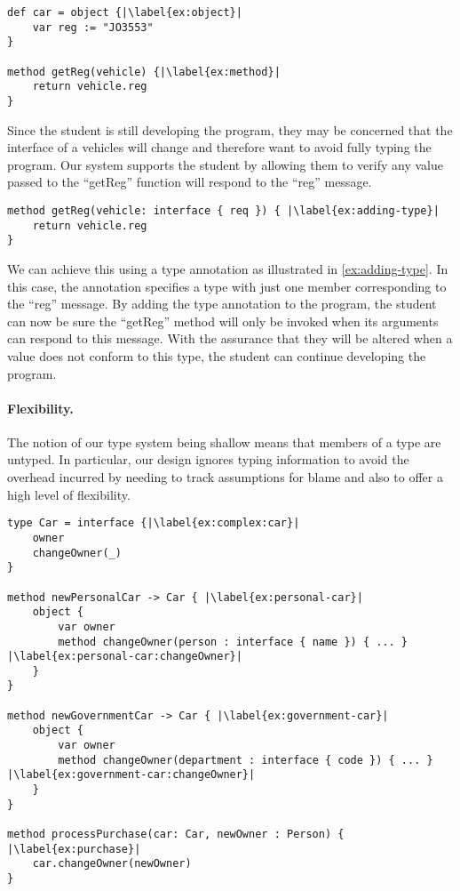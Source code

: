 \begin{lstlisting}[caption={The start of a simple program for tracking vehicle information.},escapechar=|]
def car = object {|\label{ex:object}|
    var reg := "JO3553"
}

method getReg(vehicle) {|\label{ex:method}|
    return vehicle.reg
}
\end{lstlisting}

Since the student is still developing the program, 
they may be concerned that the interface of a vehicles will change 
and therefore want to avoid fully typing the program.
Our system supports the student by allowing them to verify
any value passed to the ``getReg'' function will respond
to the ``reg'' message. 


\begin{lstlisting}[caption={Adding a type annotation to a method parameter.},escapechar=|]
method getReg(vehicle: interface { req }) { |\label{ex:adding-type}|
    return vehicle.reg
}
\end{lstlisting}

We can achieve this using a type annotation 
as illustrated in \cref{ex:adding-type}. 
In this case, 
the annotation specifies a type with just one member
corresponding to the ``reg'' message.
By adding the type annotation to the program, 
the student can now be sure the ``getReg'' method
will only be invoked when its arguments can respond to this message.
With the assurance that they will be altered when a value 
does not conform to this type,
the student can continue developing the program.

\paragraph{Flexibility.}

The notion of our type system being shallow means 
that members of a type are untyped.
In particular, our design ignores typing information
to avoid the overhead incurred by needing to track assumptions for blame and
also to offer a high level of flexibility.

\begin{lstlisting}[caption={A well-typed but globally inconsistent program.},escapechar=|,label={ex:complex}]
type Car = interface {|\label{ex:complex:car}|
    owner
    changeOwner(_)
}

method newPersonalCar -> Car { |\label{ex:personal-car}|
    object {
        var owner
        method changeOwner(person : interface { name }) { ... } |\label{ex:personal-car:changeOwner}|
    }
}

method newGovernmentCar -> Car { |\label{ex:government-car}|
    object {
        var owner
        method changeOwner(department : interface { code }) { ... } |\label{ex:government-car:changeOwner}|
    }
}

method processPurchase(car: Car, newOwner : Person) { |\label{ex:purchase}|
    car.changeOwner(newOwner)
}
\end{lstlisting}

